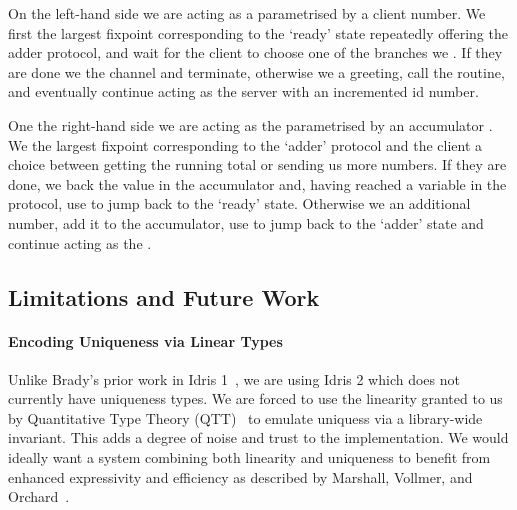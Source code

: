 \documentclass{easychair}
\begin{document}
\noindent\begin{minipage}[t]{.49\textwidth}
\end{minipage}\hfill
\begin{minipage}[t]{.49\textwidth}
\end{minipage}

\vspace*{1em}

On the left-hand side we are acting as a  parametrised by a client
 number. We first  the largest fixpoint
corresponding to the `ready' state repeatedly offering the adder protocol,
and wait for the client to choose one of the branches we .
If they are done we  the channel and terminate,
otherwise we  a greeting, call the
 routine,
and eventually continue acting as the server with an incremented id number.

One the right-hand side we are acting as the  parametrised by an
accumulator . We  the largest
fixpoint corresponding to the `adder' protocol and
 the client a choice between getting the
running total or sending us more numbers.
%
If they are done, we  back the value in the accumulator
and, having reached a  variable in the protocol,
use  to jump back to the `ready' state.
%
Otherwise we  an additional number,
add it to the accumulator, use  to jump
back to the `adder' state and continue acting as the .

\subsection*{Limitations and Future Work}

\paragraph{Encoding Uniqueness via Linear Types}
Unlike Brady's prior work in Idris 1~\cite{DBLP:journals/aghcs/Brady17},
we are using Idris 2 which does not currently have uniqueness types.
We are forced to use the linearity granted to us by
Quantitative Type Theory (QTT)~\cite{DBLP:conf/birthday/McBride16,DBLP:conf/lics/Atkey18}
to emulate uniquess via a library-wide invariant.
%
This adds a degree of noise and trust to the implementation.
We would ideally want a system combining both linearity and uniqueness
to benefit from enhanced expressivity and efficiency as described
by Marshall, Vollmer, and Orchard~\cite{DBLP:conf/esop/MarshallVO22}.
\end{document}
